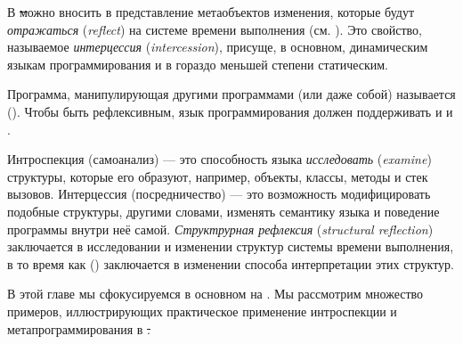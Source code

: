 \documentclass[a4paper,10pt,twoside]{book}
\begin{document}
В \st можно вносить в представление метаобъектов изменения, которые будут \emph{отражаться} (\emph{reflect}) на системе времени выполнения (см. ). 
Это свойство, называемое \emph{интерцессия} (\emph{intercession}), присуще, в основном, динамическим языкам программирования и в гораздо меньшей степени статическим.

Программа, манипулирующая другими программами (или даже собой) называется  ().
Чтобы быть рефлексивным, язык программирования должен поддерживать и  и .

Интроспекция (самоанализ) --- это способность языка \emph{исследовать} (\emph{examine}) структуры, которые его образуют, например, объекты, классы, методы и стек вызовов.
Интерцессия (посредничество) --- это возможность модифицировать подобные структуры, другими словами, изменять семантику языка и поведение программы внутри неё самой.
\emph{Структрурная рефлексия} (\emph{structural reflection}) заключается в исследовании и изменении структур системы времени выполнения, в то время как  () заключается в изменении способа интерпретации этих структур.

В этой главе мы сфокусируемся в основном на .
Мы рассмотрим множество примеров, иллюстрирующих практическое применение интроспекции и метапрограммирования в \st.
\end{document}
